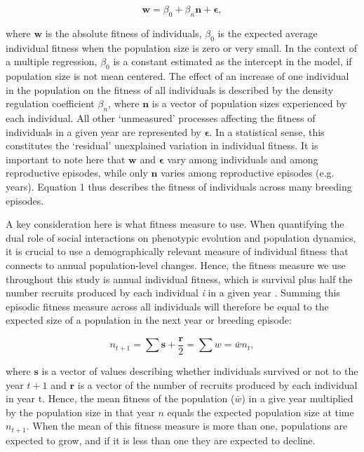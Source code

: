 \documentclass{article}
\begin{document}
\begin{equation} \label{eq: fitness1}
\bm{w}=\beta_{0} +\beta_{n} \bm{n}  +  \bm{\epsilon},
\end{equation}

\noindent where $\bm{w}$ is the absolute fitness of individuals, $\beta_{0}$ is the expected average individual fitness when the population size is zero or very small. In the context of a multiple regression, $\beta_{0}$ is a constant estimated as the intercept in the model, if population size is not mean centered. The effect of an increase of one individual in the population on the fitness of all individuals is described by the density regulation coefficient $\beta_{n}$, where $\bm{n}$ is a vector of population sizes experienced by each individual. All other `unmeasured' processes affecting the fitness of individuals in a given year are represented by $\bm{\epsilon}$. In a statistical sense, this constitutes the 
`residual' unexplained variation in individual fitness. It is important to note here that $\bm{w}$ and $\bm{\epsilon}$ vary among individuals and among reproductive episodes, while only $\bm{n}$ varies among reproductive episodes (e.g. years). Equation 1 thus describes the fitness of individuals across many breeding episodes.

A key consideration here is what fitness measure to use. When quantifying the dual role of social interactions on phenotypic evolution and population dynamics, it is crucial to use a demographically relevant measure of individual fitness that connects to annual population-level changes. Hence, the fitness measure we use throughout this study is annual individual fitness, which is survival plus half the number recruits produced by each individual \textit{i} in a given year \citep{Saether2015}. Summing this episodic fitness measure across all individuals will therefore be equal to the expected size of a population in the next year or breeding episode: 

\begin{equation} \label{eq:fitness measure}
n_{t+1}=\sum \bm{s} + \frac{\bm{r}}{2}= \sum w=\bar{w}n_{t}, 
\end{equation}

\noindent where  $\bm{s}$ is a vector of values describing whether individuals survived or not to the year $t+1$ and $\bm{r}$ is a vector of the number of recruits produced by each individual in year t. Hence, the mean fitness of the population ($\bar{w}$) in a give year multiplied by the population size in that year $n$ equals the expected population size at time $n_{t + 1}$. When the mean of this fitness measure is more than one, populations are expected to grow, and if it is less than one they are expected to decline.
\end{document}

